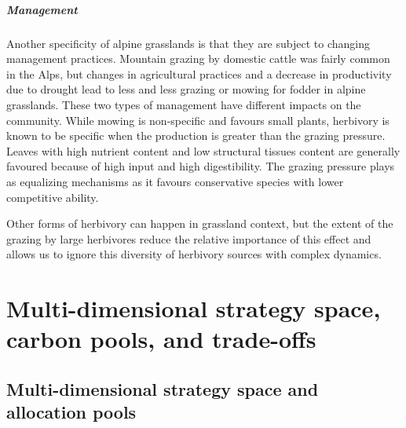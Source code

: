 \paragraph{Management}
Another specificity of alpine grasslands is that they are subject to changing management practices. Mountain grazing by domestic cattle was fairly common in the Alps, but changes in agricultural practices and a decrease in productivity due to drought lead to less and less grazing or mowing for fodder in alpine grasslands. These two types of management have different impacts on the community. While mowing is non-specific and favours small plants, herbivory is known to be specific when the production is greater than the grazing pressure. Leaves with high nutrient content and low structural tissues content are generally favoured because of high input and high digestibility. The grazing pressure plays as equalizing mechanisms as it favours conservative species with lower competitive ability.

Other forms of herbivory can happen in grassland context, but the extent of the grazing by large herbivores reduce the relative importance of this effect and allows us to ignore this diversity of herbivory sources with complex dynamics.


\chapter{Multi-dimensional strategy space,\\carbon pools, and trade-offs} \label{chapter:strategy-space}
\section{Multi-dimensional strategy space and allocation pools}
%

